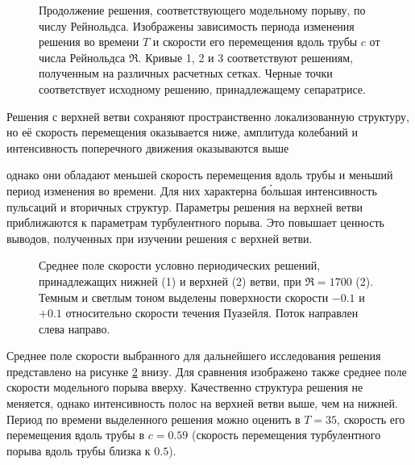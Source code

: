 \begin{figure}
\caption{Продолжение решения, соответствующего модельному порыву, по числу Рейнольдса. Изображены зависимость периода изменения решения во времени $T$ и скорости его перемещения вдоль трубы $c$ от числа Рейнольдса $\Re$. Кривые 1, 2 и 3 соответствуют решениям, полученным на различных расчетных сетках. Черные точки соответствует исходному решению, принадлежащему сепаратрисе.}
\label{local_contin_pic}
\end{figure}

Решения с верхней ветви сохраняют пространственно локализованную структуру, но её скорость перемещения оказывается ниже, амплитуда колебаний и интенсивность поперечного движения оказываются выше 


однако они обладают меньшей скорость перемещения вдоль трубы и меньший период изменения во времени. Для них характерна б\'{о}льшая интенсивность пульсаций и вторичных структур. Параметры решения на верхней ветви приближаются к параметрам турбулентного порыва. Это повышает ценность выводов, полученных при изучении решения  с верхней ветви. 


\begin{figure}
\caption{Среднее поле скорости условно периодических решений, принадлежащих нижней (1) и верхней (2) ветви, при $\Re = 1700$ (2). Темным и светлым тоном выделены поверхности скорости $-0.1$ и $+0.1$ относительно скорости течения Пуазейля. Поток направлен слева направо.}
\label{3D_contin_cmp_pic}
\end{figure}

Среднее поле скорости выбранного для дальнейшего исследования решения представлено на рисунке \ref{3D_contin_cmp_pic} внизу. Для сравнения изображено также среднее поле скорости модельного порыва вверху. Качественно структура решения не меняется, однако интенсивность полос на верхней ветви выше, чем на нижней. Период по времени выделенного решения можно оценить в $T = 35$, скорость его перемещения вдоль трубы в $c = 0.59$ (скорость перемещения турбулентного порыва вдоль трубы близка к $0.5$). 



